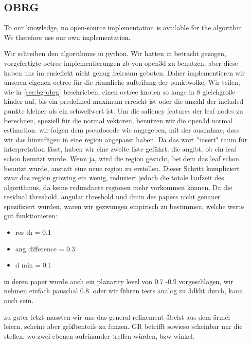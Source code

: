 \documentclass[main.tex]{subfiles}
\begin{document}
\subsection*{OBRG}
To our knowledge, no open-source implementation is available for the algorithm.
We therefore use our own implementation.

Wir schreiben den algorithmus in python. Wir hatten in betracht gezogen, vorgefertigte octree implementierungen zb von 
open3d zu benutzen, aber diese haben uns im endeffekt nicht genug freiraum geboten. Daher implementieren wir unseren eigenen 
octree für die räumliche aufteilung der punktwolke.
Wir teilen, wie in \ref{sec:bg-obrg} beschrieben, einen octree knoten so lange in 8 gleichgroße kinder auf, bis ein predefined
maximum erreicht ist oder die anzahl der included punkte kleiner als ein schwellwert ist.
Um die saliency features der leaf nodes zu berechnen, speziell für die normal vektoren, benutzen wir die 
open3d normal estimation.
wir folgen dem pseudocode wie angegeben, mit der ausnahme, dass wir das hinzufügen in eine region angepasst haben.
Da das wort "insert" raum für interpretation lässt, haben wir eine zweite liste geführt, die angibt, ob ein leaf schon
benutzt wurde. Wenn ja, wird die region gesucht, bei dem das leaf schon benutzt wurde, anstatt eine neue region zu erstellen.
Dieser Schritt kompliziert zwar das region growing ein wenig, reduziert jedoch die totale laufzeit des algorithmus, da 
keine redundante regionen mehr vorkommen können.
Da die residual threshold, angular threshold und dmin des papers nicht genauer spezifiziert wurden, waren wir gezwungen
empirisch zu bestimmen, welche werte gut funktionieren:
\begin{itemize}
    \item res th = 0.1 
    \item ang difference = 0.3
    \item d min =  0.1
\end{itemize}

in deren paper wurde auch ein planarity level von 0.7 -0.9 vorgeschlagen, wir nehmen einfach pauschal 0.8.
oder wir führen tests analog zu 3dkht durch, kann auch sein.

zu guter letzt mussten wir uns das general refinement übelst aus dem ärmel leiern, scheint aber größtenteils 
zu funzen. GR betrifft sowieso scheinbar nur die stellen, wo zwei ebenen aufeinander treffen würden, bzw winkel.
\end{document}
